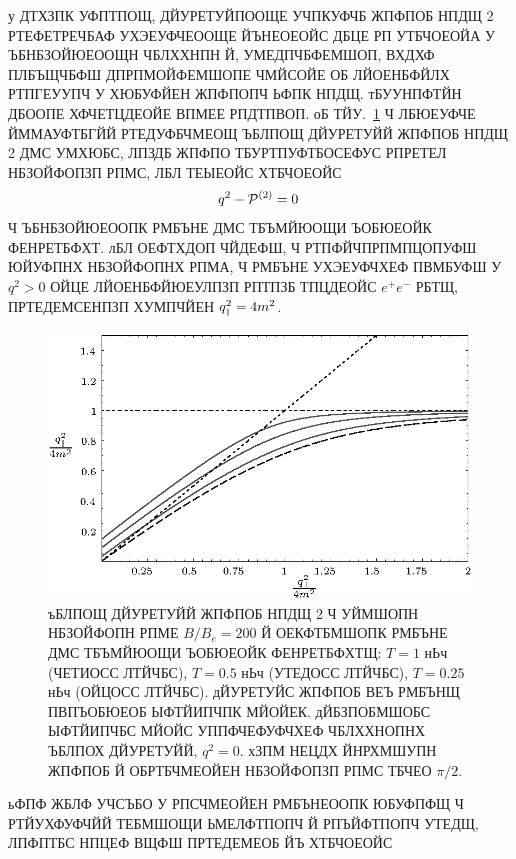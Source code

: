 \documentclass[koi8-r]{pazh2col}
\def\mprl{\mbox{\tiny $\|$}}
\def\beq{\begin{eqnarray}}
\def\eeq{\end{eqnarray}}
\def\beq{\begin{eqnarray}}
\def\eeq{\end{eqnarray}}
\begin{document}
 
у ДТХЗПК УФПТПОЩ, ДЙУРЕТУЙПООЩЕ УЧПКУФЧБ ЖПФПОБ НПДЩ 2  РТЕФЕТРЕЧБАФ УХЭЕУФЧЕООЩЕ ЙЪНЕОЕОЙС ДБЦЕ 
РП УТБЧОЕОЙА У ЪБНБЗОЙЮЕООЩН ЧБЛХХНПН Й, УМЕДПЧБФЕМШОП, ВХДХФ ПЛБЪЩЧБФШ ДПРПМОЙФЕМШОПЕ ЧМЙСОЙЕ 
ОБ ЛЙОЕНБФЙЛХ РТПГЕУУПЧ У 
ХЮБУФЙЕН ЖПФПОПЧ ЬФПК НПДЩ. тБУУНПФТЙН ДБООПЕ ХФЧЕТЦДЕОЙЕ ВПМЕЕ РПДТПВОП.
оБ ТЙУ.~\ref{fig:disT}  Ч ЛБЮЕУФЧЕ ЙММАУФТБГЙЙ РТЕДУФБЧМЕОЩ ЪБЛПОЩ ДЙУРЕТУЙЙ ЖПФПОБ  НПДЩ 2 ДМС УМХЮБС, ЛПЗДБ 
ЖПФПО ТБУРТПУФТБОСЕФУС РПРЕТЕЛ НБЗОЙФОПЗП РПМС, 
ЛБЛ  ТЕЫЕОЙС ХТБЧОЕОЙС
%
\beq
q^2 - {\cal P}^{(2)} = 0 \, 
\label{disper}
\eeq
\noindent  Ч ЪБНБЗОЙЮЕООПК РМБЪНЕ ДМС ТБЪМЙЮОЩИ ЪОБЮЕОЙК ФЕНРЕТБФХТ. 
лБЛ ОЕФТХДОП ЧЙДЕФШ, Ч РТПФЙЧПРПМПЦОПУФШ ЮЙУФПНХ 
НБЗОЙФОПНХ РПМА, Ч РМБЪНЕ УХЭЕУФЧХЕФ ПВМБУФШ У  $q^2 > 0$ ОЙЦЕ  ЛЙОЕНБФЙЮЕУЛПЗП  РПТПЗБ 
ТПЦДЕОЙС $e^+e^-$ РБТЩ, ПРТЕДЕМСЕНПЗП ХУМПЧЙЕН $q^2_{\mprl} = 4 m^2$.  

\begin{figure}
\centering
\includegraphics[width=\columnwidth]{fig2_1.eps}
\caption{ъБЛПОЩ ДЙУРЕТУЙЙ ЖПФПОБ НПДЩ 2 Ч УЙМШОПН НБЗОЙФОПН РПМЕ  $B/B_e = 200$  
Й ОЕКФТБМШОПК РМБЪНЕ ДМС ТБЪМЙЮОЩИ ЪОБЮЕОЙК ФЕНРЕТБФХТЩ:  $T = 1$ нЬч 
(ЧЕТИОСС ЛТЙЧБС), $T = 0.5$ нЬч (УТЕДОСС ЛТЙЧБС), $T = 0.25$ нЬч (ОЙЦОСС ЛТЙЧБС). 
дЙУРЕТУЙС ЖПФПОБ ВЕЪ РМБЪНЩ ПВПЪОБЮЕОБ ЫФТЙИПЧПК МЙОЙЕК. дЙБЗПОБМШОБС ЫФТЙИПЧБС 
МЙОЙС УППФЧЕФУФЧХЕФ ЧБЛХХНОПНХ ЪБЛПОХ ДЙУРЕТУЙЙ, $q^2 = 0$. 
хЗПМ  НЕЦДХ ЙНРХМШУПН ЖПФПОБ  Й ОБРТБЧМЕОЙЕН  НБЗОЙФОПЗП РПМС ТБЧЕО  $\pi/2$.
}
\label{fig:disT}
\end{figure}

ьФПФ ЖБЛФ УЧСЪБО  У
 РПСЧМЕОЙЕН РМБЪНЕООПК ЮБУФПФЩ Ч РТЙУХФУФЧЙЙ ТЕБМШОЩИ ЬМЕЛФТПОПЧ Й РПЪЙФТПОПЧ УТЕДЩ, 
ЛПФПТБС НПЦЕФ ВЩФШ ПРТЕДЕМЕОБ ЙЪ ХТБЧОЕОЙС
\end{document}
